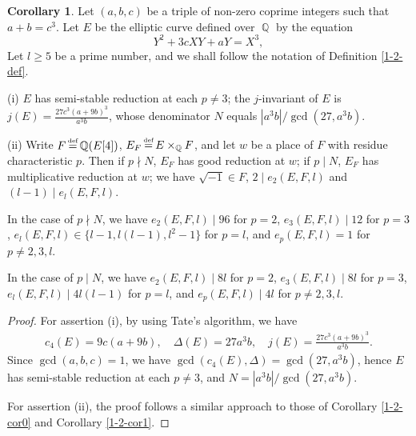 \documentclass[a4paper, 12pt]{article}
\DeclareMathOperator{\defeq}{\overset{\text{\tiny{def}}}{=}}
\DeclareMathOperator{\Q}{\mathbb{Q}}
\numberwithin{equation}{section}
\theoremstyle{definition}
\newtheorem{cor}[thm]{Corollary}
\begin{document}
\begin{cor} \label{1-2-cor3}
Let $(a,b,c)$ be a triple of non-zero coprime integers such that $a + b = c^3$.
Let $E$ be the elliptic curve defined over $\Q$ by the equation 
$$Y^2 + 3cXY + aY= X^3,$$
Let $l\ge 5$ be a prime number, and we shall follow the notation of Definition \ref{1-2-def}.

(i) $E$ has semi-stable reduction at each $p\neq 3$;
the $j$-invariant of $E$ is $j(E) = \frac{27 c^3 (a+9b)^3}{a^3 b}$,
whose denominator $N$ equals $|a^3 b| / \gcd(27, a^3 b)$.

(ii) Write $F\defeq \Q(E[4])$, $E_F \defeq E\times_{\Q} F$, and let $w$ be a place of $F$ with residue characteristic $p$. 
Then if $p \nmid N$, $E_F$ has good reduction at $w$; if $p \mid N$, $E_F$ has multiplicative reduction at $w$; we have $\sqrt{-1} \in F$, $2\mid e_2(E,F,l)$ and $(l-1) \mid e_l(E,F,l)$.

In the case of $p \nmid N$, we have 
$e_2(E,F,l) \mid 96$ for $p=2$, $e_3(E,F,l) \mid 12$ for $p=3$, 
$e_l(E,F,l) \in \{l-1, l(l-1), l^2-1\}$ for $p=l$, and $e_p(E,F,l) = 1$ for $p\neq 2,3,l$.
 
In the case of $p \mid N$, we have
$e_2(E,F,l) \mid 8l$ for $p=2$, $e_3(E,F,l) \mid 8l$ for $p=3$, 
$e_l(E,F,l) \mid 4 l (l-1)$ for $p=l$, 
and $e_p(E,F,l) \mid 4 l$ for $p\neq 2,3,l$.
\end{cor}
\begin{proof}
For assertion (i), by using Tate's algorithm, we have 
\small\begin{align*}
c_4(E) = 9 c (a+9b), \quad
\Delta(E) = 27 a^3 b, \quad 
j(E) = \frac{27 c^3 (a+9b)^3}{a^3 b}.
\end{align*}\normalsize
Since $\gcd(a,b,c) = 1$, we have $\gcd(c_4(E), \Delta) = \gcd(27, a^3 b)$, hence $E$ has semi-stable reduction at each $p\neq 3$, and $N = |a^3 b| / \gcd(27, a^3 b)$.

For assertion (ii), the proof follows a similar approach to those of Corollary \ref{1-2-cor0} and Corollary \ref{1-2-cor1}.
\end{proof}
\end{document}
